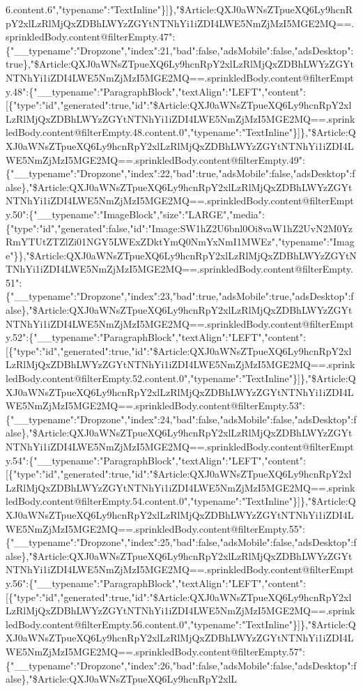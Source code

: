 6.content.6","typename":"TextInline"\}{]}\},"\$Article:QXJ0aWNsZTpueXQ6Ly9hcnRpY2xlLzRlMjQxZDBhLWYzZGYtNTNhYi1iZDI4LWE5NmZjMzI5MGE2MQ==.sprinkledBody.content@filterEmpty.47":\{"\_\_typename":"Dropzone","index":21,"bad":false,"adsMobile":false,"adsDesktop":true\},"\$Article:QXJ0aWNsZTpueXQ6Ly9hcnRpY2xlLzRlMjQxZDBhLWYzZGYtNTNhYi1iZDI4LWE5NmZjMzI5MGE2MQ==.sprinkledBody.content@filterEmpty.48":\{"\_\_typename":"ParagraphBlock","textAlign":"LEFT","content":{[}\{"type":"id","generated":true,"id":"\$Article:QXJ0aWNsZTpueXQ6Ly9hcnRpY2xlLzRlMjQxZDBhLWYzZGYtNTNhYi1iZDI4LWE5NmZjMzI5MGE2MQ==.sprinkledBody.content@filterEmpty.48.content.0","typename":"TextInline"\}{]}\},"\$Article:QXJ0aWNsZTpueXQ6Ly9hcnRpY2xlLzRlMjQxZDBhLWYzZGYtNTNhYi1iZDI4LWE5NmZjMzI5MGE2MQ==.sprinkledBody.content@filterEmpty.49":\{"\_\_typename":"Dropzone","index":22,"bad":true,"adsMobile":false,"adsDesktop":false\},"\$Article:QXJ0aWNsZTpueXQ6Ly9hcnRpY2xlLzRlMjQxZDBhLWYzZGYtNTNhYi1iZDI4LWE5NmZjMzI5MGE2MQ==.sprinkledBody.content@filterEmpty.50":\{"\_\_typename":"ImageBlock","size":"LARGE","media":\{"type":"id","generated":false,"id":"Image:SW1hZ2U6bnl0Oi8vaW1hZ2UvN2M0YzRmYTUtZTZlZi01NGY5LWExZDktYmQ0NmYxNmI1MWEz","typename":"Image"\}\},"\$Article:QXJ0aWNsZTpueXQ6Ly9hcnRpY2xlLzRlMjQxZDBhLWYzZGYtNTNhYi1iZDI4LWE5NmZjMzI5MGE2MQ==.sprinkledBody.content@filterEmpty.51":\{"\_\_typename":"Dropzone","index":23,"bad":true,"adsMobile":true,"adsDesktop":false\},"\$Article:QXJ0aWNsZTpueXQ6Ly9hcnRpY2xlLzRlMjQxZDBhLWYzZGYtNTNhYi1iZDI4LWE5NmZjMzI5MGE2MQ==.sprinkledBody.content@filterEmpty.52":\{"\_\_typename":"ParagraphBlock","textAlign":"LEFT","content":{[}\{"type":"id","generated":true,"id":"\$Article:QXJ0aWNsZTpueXQ6Ly9hcnRpY2xlLzRlMjQxZDBhLWYzZGYtNTNhYi1iZDI4LWE5NmZjMzI5MGE2MQ==.sprinkledBody.content@filterEmpty.52.content.0","typename":"TextInline"\}{]}\},"\$Article:QXJ0aWNsZTpueXQ6Ly9hcnRpY2xlLzRlMjQxZDBhLWYzZGYtNTNhYi1iZDI4LWE5NmZjMzI5MGE2MQ==.sprinkledBody.content@filterEmpty.53":\{"\_\_typename":"Dropzone","index":24,"bad":false,"adsMobile":false,"adsDesktop":false\},"\$Article:QXJ0aWNsZTpueXQ6Ly9hcnRpY2xlLzRlMjQxZDBhLWYzZGYtNTNhYi1iZDI4LWE5NmZjMzI5MGE2MQ==.sprinkledBody.content@filterEmpty.54":\{"\_\_typename":"ParagraphBlock","textAlign":"LEFT","content":{[}\{"type":"id","generated":true,"id":"\$Article:QXJ0aWNsZTpueXQ6Ly9hcnRpY2xlLzRlMjQxZDBhLWYzZGYtNTNhYi1iZDI4LWE5NmZjMzI5MGE2MQ==.sprinkledBody.content@filterEmpty.54.content.0","typename":"TextInline"\}{]}\},"\$Article:QXJ0aWNsZTpueXQ6Ly9hcnRpY2xlLzRlMjQxZDBhLWYzZGYtNTNhYi1iZDI4LWE5NmZjMzI5MGE2MQ==.sprinkledBody.content@filterEmpty.55":\{"\_\_typename":"Dropzone","index":25,"bad":false,"adsMobile":false,"adsDesktop":false\},"\$Article:QXJ0aWNsZTpueXQ6Ly9hcnRpY2xlLzRlMjQxZDBhLWYzZGYtNTNhYi1iZDI4LWE5NmZjMzI5MGE2MQ==.sprinkledBody.content@filterEmpty.56":\{"\_\_typename":"ParagraphBlock","textAlign":"LEFT","content":{[}\{"type":"id","generated":true,"id":"\$Article:QXJ0aWNsZTpueXQ6Ly9hcnRpY2xlLzRlMjQxZDBhLWYzZGYtNTNhYi1iZDI4LWE5NmZjMzI5MGE2MQ==.sprinkledBody.content@filterEmpty.56.content.0","typename":"TextInline"\}{]}\},"\$Article:QXJ0aWNsZTpueXQ6Ly9hcnRpY2xlLzRlMjQxZDBhLWYzZGYtNTNhYi1iZDI4LWE5NmZjMzI5MGE2MQ==.sprinkledBody.content@filterEmpty.57":\{"\_\_typename":"Dropzone","index":26,"bad":false,"adsMobile":false,"adsDesktop":false\},"\$Article:QXJ0aWNsZTpueXQ6Ly9hcnRpY2xlL